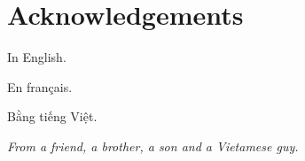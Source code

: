 \chapter*{Acknowledgements}

In English.

En français.

Bằng tiếng Việt.

\begin{flushright}
\textit{From a friend, a brother, a son and a Vietamese guy.}
\end{flushright}
